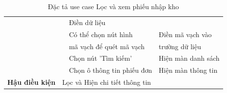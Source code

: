 \documentclass[../DoAn.tex]{subfiles}
\begin{document}
\begin{table}[H]
\begin{tabular}{|l|c|l|l|}
                                                &                                                                                 & Điền dữ liệu                            &                                                 \\
                                                &                                                                                 & Có thể chọn nút hình                    & Điền mã vạch vào                                \\
                                                &                                                                                 & mã vạch để quét mã vạch                 & trường dữ liệu                                  \\ \cline{3-4}
                                                &                                                                                 & Chọn nút 'Tìm kiếm'                     & Hiện màn danh sách                              \\ \cline{3-4}
                                                &                                                                                 & Chọn ô thông tin phiếu đơn              & Hiện màn thông tin                              \\ \hline
        \textbf{Hậu điều kiện}                  & \multicolumn{3}{l|}{Lọc và Hiện chi tiết thông tin}                                                                                                                         \\ \hline
    \end{tabular}
    \caption{Đặc tả use case Lọc và xem phiếu nhập kho}
    \label{table:uc-importreport-filter}
\end{table}
\break
\end{document}
